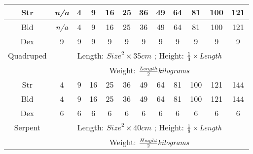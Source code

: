 \documentclass[twoside]{book}
\begin{document}
\begin{table}[!htb]
\begin{center}
\begin{tabular}{|c|c|c|c|c|c|c|c|c|c|c|c|}
\hline Str &
                    \textit{n/a}
                  & 4 & 9 & 16 & 25 & 36 & 49 & 64 & 81 & 100 & 121 \\

\hline Bld &
                    \textit{n/a}
                  & 4 & 9 & 16 & 25 & 36 & 49 & 64 & 81 & 100 & 121 \\

\hline Dex & 9 & 9 & 9 & 9 & 9 & 9 & 9 & 9 & 9 & 9 & 9 \\

\hline Quadruped &
\multicolumn{11}{c}{
              Length: \begin{math}  
                        {Size}^{ 2 }   \times     35 
                           cm  \end{math} ; Height: \begin{math} 
                           {{ 1 }\over{ 3 }}  
                           \times    Length  \end{math}
                  }\\

&
\multicolumn{11}{c}{
              Weight: \begin{math}    {{
                     Length}\over{ 2 }}  kilograms
                        \end{math}
                  }\\

\hline Str & 4 & 9 & 16 & 25 & 36 & 49 & 64 & 81 & 100 & 121 & 144 \\

\hline Bld & 4 & 9 & 16 & 25 & 36 & 49 & 64 & 81 & 100 & 121 & 144 \\

\hline Dex & 6 & 6 & 6 & 6 & 6 & 6 & 6 & 6 & 6 & 6 & 6 \\

\hline Serpent &
\multicolumn{11}{c}{
              Length: \begin{math}  
                        {Size}^{ 2 }   \times   40 cm
                            \end{math} ; Height: \begin{math} 
                           {{ 1 }\over{ 8 }}  
                           \times  Length  \end{math}
                  }\\

&
\multicolumn{11}{c}{
             Weight: \begin{math}  {{Height
                    }\over{ 2 }}  kilograms 
                     \end{math}
                  }\\


\end{tabular}
\end{center}
\end{table}
\end{document}
